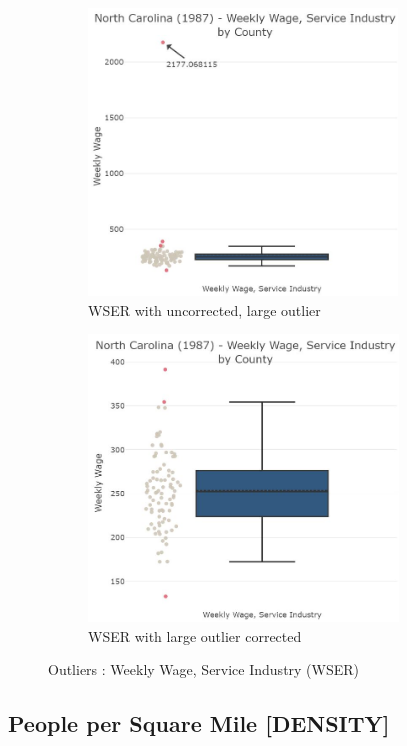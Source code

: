 \begin{figure}[!ht]
	\begin{subfigure}[t]{0.5\textwidth}
		\centering
		\includegraphics[width=\linewidth,height=3in]{images/EDA_wser_uncorrected.jpg}
		\caption{WSER with uncorrected, large outlier}
		\label{fig:EDA WSER variable uncorrected}
	\end{subfigure}
	\hfill
	\begin{subfigure}[t]{0.5\textwidth}
		\centering
		\includegraphics[width=\linewidth,height=3in]{images/EDA_wser_corrected.jpg}
		\caption{WSER with large outlier corrected}
		\label{fig:EDA WSER variable corrected}
	\end{subfigure}
	\caption{Outliers : Weekly Wage, Service Industry (WSER)}
	\label{fig:EDA WSER Outlier Treatment}
\end{figure}

\pagebreak

\subsection{People per Square Mile [DENSITY]}

